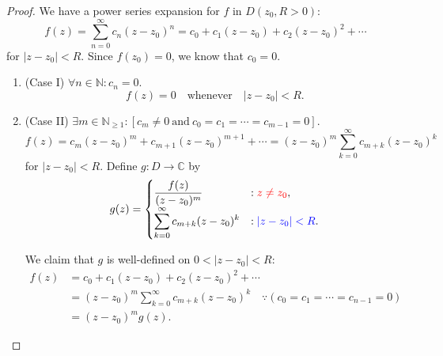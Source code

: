 \documentclass[12pt,openany]{book}
\theoremstyle{definition}
\newcommand{\N}{\mathbb{N}}
\newcommand{\C}{\mathbb{C}}
\newcommand{\abs}[1]{\left\lvert #1 \right\rvert}
\begin{document}
	\begin{proof}
		We have a power series expansion for $f$ in $D(z_0, R>0)$: \[
		f(z)=\sum_{n=0}^\infty c_n(z-z_0)^n=c_0+c_1(z-z_0)+c_2(z-z_0)^2+\cdots
		\] for $\abs{z-z_0}<R$. Since $f(z_0)=0$, we know that $c_0=0$. \begin{enumerate}
			\item[] (Case I) $\forall n\in\N:c_n=0$. \[
			f(z)=0\quad\text{whenever}\quad \abs{z-z_0}<R.
			\]
			\item[] (Case II) $\exists m\in\N_{\geq 1}:[c_m\neq 0\ \text{and}\ c_0=c_1=\cdots=c_{m-1}=0]$. \[
			f(z)=c_m(z-z_0)^m+c_{m+1}(z-z_0)^{m+1}+\cdots =(z-z_0)^m\sum_{k=0}^{\infty}c_{m+k}(z-z_0)^k
			\] for $\abs{z-z_0}<R$. Define $g:D\to\C$ by \[
			g(z)=\begin{cases}
			\displaystyle \frac{f(z)}{(z-z_0)^m} &:\textcolor{red}{z\neq z_0},\\
			\displaystyle \sum_{k=0}^{\infty}c_{m+k}(z-z_0)^k &:\textcolor{blue}{\abs{z-z_0}<R}.\\
			\end{cases}
			\] \begin{center}
			\end{center} We claim that $g$ is well-defined on $0<\abs{z-z_0}<R$: \begin{align*}
			f(z)&=c_0+c_1(z-z_0)+c_2(z-z_0)^2+\cdots\\
			&=(z-z_0)^m\sum_{k=0}^{\infty}c_{m+k}(z-z_0)^k\quad\because(c_0=c_1=\cdots=c_{n-1}=0)\\
			&=(z-z_0)^m g(z).
			\end{align*}
		\end{enumerate}
	\end{proof}
\end{document}
